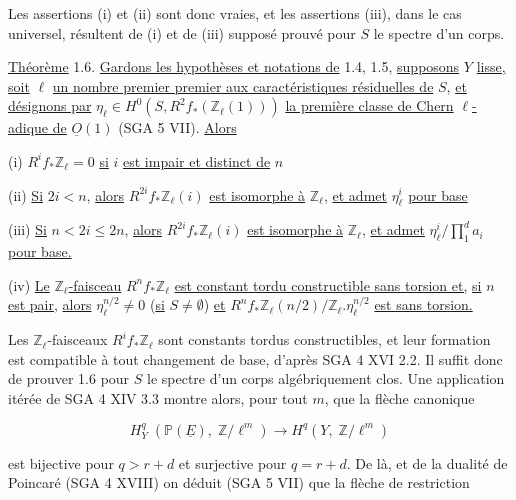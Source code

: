 Les assertions (i) et (ii) sont donc vraies, et les assertions (iii), dans le cas universel, résultent de (i) et de (iii) supposé prouvé pour $S$ le spectre d'un corps.

\underline{Théorème} 1.6. \underline{Gardons les hypothèses et notations de} 1.4, 1.5, \underline{supposons} $Y$ \underline{lisse,} \underline{soit} $\ell$ \underline{un nombre premier premier aux caractéristiques résiduelles de} $S$, \underline{et désignons par} $\eta_\ell \in H^0(S,R^2 f_*( \mathbb{Z}_\ell(1)))$ \underline{la première classe de Chern} $\ell$\underline{-adique de} $\underline{O}(1)$ (SGA 5 VII). \underline{Alors}

(i) $R^i f_* \mathbb{Z}_\ell = 0$ \underline{si} $i$ \underline{est impair et distinct de} $n$

(ii) \underline{Si} $2i < n$, \underline{alors} $R^{2i} f_* \mathbb{Z}_\ell(i)$ \underline{est isomorphe à} $\mathbb{Z}_\ell$, \underline{et admet} $\eta_\ell^i$ \underline{pour base}

(iii) \underline{Si} $n < 2i \leq 2n$, \underline{alors} $R^{2i} f_* \mathbb{Z}_\ell(i)$ \underline{est isomorphe à} $\mathbb{Z}_\ell$, \underline{et admet} $\eta_\ell^i / \prod_1^d a_i$ \underline{pour base.}

(iv) \underline{Le} $\mathbb{Z}_\ell$\underline{-faisceau} $R^n f_* \mathbb{Z}_\ell$ \underline{est constant tordu constructible sans torsion et,} \underline{si} $n$ \underline{est pair,} \underline{alors} $\eta_\ell^{n/2} \neq 0$ (\underline{si} $S \neq \emptyset$) \underline{et} $R^n f_* \mathbb{Z}_\ell(n/2)/ \mathbb{Z}_\ell . \eta_\ell^{n/2}$ \underline{est sans torsion.}

Les $\mathbb{Z}_\ell$-faisceaux $R^i f_* \mathbb{Z}_\ell$ sont constants tordus constructibles, et leur formation est compatible à tout changement de base, d'après SGA 4 XVI 2.2. Il suffit donc de prouver 1.6 pour $S$ le spectre d'un corps algébriquement clos. Une application itérée de SGA 4 XIV 3.3 montre alors, pour tout $m$, que la flèche canonique

\begin{equation*}
H^q_Y \; (\mathbb{P}(\underline{E}), \; \mathbb{Z}/\ell^m) \longrightarrow H^q(Y, \; \mathbb{Z}/\ell^m)
\end{equation*}

est bijective pour $q > r + d$ et surjective pour $q = r + d$. De là, et de la dualité de Poincaré (SGA 4 XVIII) on déduit (SGA 5 VII) que la flèche de restriction

